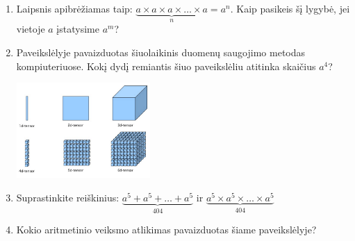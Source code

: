 \documentclass[a4paper]{article}
\begin{document}
\begin{minipage}[b]{0.7\textwidth}
\begin{enumerate}
\item Laipsnis apibrėžiamas taip: $\underbrace{a\times a \times a \times \dots \times a}_{n} = a^n$. Kaip pasikeis šį lygybė, jei vietoje $a$ įstatysime $a^m$?
\item Paveikslėlyje pavaizduotas šiuolaikinis duomenų saugojimo metodas kompiuteriuose. Kokį dydį remiantis šiuo paveikslėliu atitinka skaičius $a^4$?

\includegraphics[width=0.4\textwidth]{tensors.png}
\item Suprastinkite reiškinius: $\underbrace{a^5+a^5+\dots+a^5}_{404}$ ir $\underbrace{a^5\times a^5\times\dots\times a^5}_{404}$
\item Kokio aritmetinio veiksmo atlikimas pavaizduotas šiame paveikslėlyje?


\end{enumerate}
\end{minipage}
\end{document}

